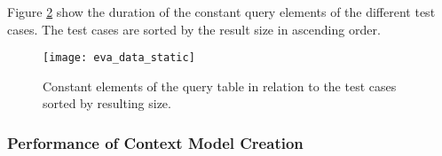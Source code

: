 \documentclass[draft,final]{vutinfth} %
\begin{document}
\begin{itemize}
\begin{figure}[!h]
		\label{fig:evaluation_perf_data_database}	
	\end{figure}
\end{itemize}

Figure \ref{fig:eva_data_static} show the duration of the constant query elements of the different test cases. The test cases are sorted by the result size in ascending order.

\begin{figure}[h]
	\centering
	\texttt{[image: eva\_data\_static]}
	\caption{Constant elements of the query table in relation to the test cases sorted by resulting size.}
	\label{fig:eva_data_static} %
\end{figure}


\subsubsection{Performance of Context Model Creation}\label{Evaluation:impact_perf_context}
\end{document}
